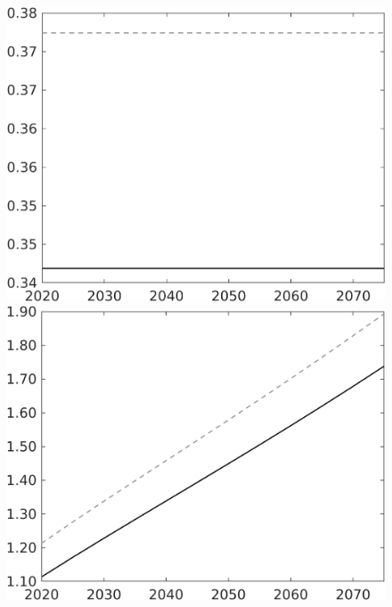 \documentclass[12pt]{article}
\begin{document}
\begin{figure}[h!!]
\begin{minipage}[]{0.32\textwidth}
	\end{minipage}	
	\begin{minipage}[]{0.32\textwidth}
		\includegraphics[width=1\textwidth]{../../codding_model/own_basedOnFried/optimalPol_010922_revision/figures/all_13Sept22/CompTaul_Equlab_LFBAU_Reg0_hh_spillover0_nsk1_xgr0_knspil1_sep1_countec0_GovRev0_etaa0.79_lgd0.png}
	\end{minipage}	
	\begin{minipage}[]{0.32\textwidth}
		\includegraphics[width=1\textwidth]{../../codding_model/own_basedOnFried/optimalPol_010922_revision/figures/all_13Sept22/CompTaul_Equlab_LFBAU_Reg0_C_spillover0_nsk1_xgr0_knspil1_sep1_countec0_GovRev0_etaa0.79_lgd0.png}

\end{minipage}
\end{figure}
\end{document}
